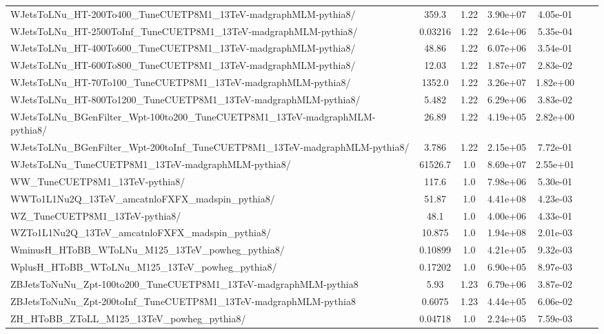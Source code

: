 \begin{table}
\begin{center}
{\begin{tabular}{|l|c|c|c|c|c|c|}
WJetsToLNu\_HT-200To400\_TuneCUETP8M1\_13TeV-madgraphMLM-pythia8/ & 359.3 & 1.22 & 3.90e+07 & {\color{orange}4.05e-01} \\
WJetsToLNu\_HT-2500ToInf\_TuneCUETP8M1\_13TeV-madgraphMLM-pythia8/ & 0.03216 & 1.22 & 2.64e+06 & 5.35e-04 \\
WJetsToLNu\_HT-400To600\_TuneCUETP8M1\_13TeV-madgraphMLM-pythia8/ & 48.86 & 1.22 & 6.07e+06 & {\color{orange}3.54e-01} \\
WJetsToLNu\_HT-600To800\_TuneCUETP8M1\_13TeV-madgraphMLM-pythia8/ & 12.03 & 1.22 & 1.87e+07 & 2.83e-02 \\
WJetsToLNu\_HT-70To100\_TuneCUETP8M1\_13TeV-madgraphMLM-pythia8/ & 1352.0 & 1.22 & 3.26e+07 & {\color{red}1.82e+00} \\
WJetsToLNu\_HT-800To1200\_TuneCUETP8M1\_13TeV-madgraphMLM-pythia8/ & 5.482 & 1.22 & 6.29e+06 & 3.83e-02 \\
WJetsToLNu\_BGenFilter\_Wpt-100to200\_TuneCUETP8M1\_13TeV-madgraphMLM-pythia8/ & 26.89 & 1.22 & 4.19e+05 & {\color{red}2.82e+00} \\
WJetsToLNu\_BGenFilter\_Wpt-200toInf\_TuneCUETP8M1\_13TeV-madgraphMLM-pythia8/ & 3.786 & 1.22 & 2.15e+05 & {\color{orange}7.72e-01} \\
WJetsToLNu\_TuneCUETP8M1\_13TeV-madgraphMLM-pythia8/ & 61526.7 & 1.0 & 8.69e+07 & {\color{red}2.55e+01} \\
WW\_TuneCUETP8M1\_13TeV-pythia8/ & 117.6 & 1.0 & 7.98e+06 & {\color{orange}5.30e-01} \\
WWTo1L1Nu2Q\_13TeV\_amcatnloFXFX\_madspin\_pythia8/ & 51.87 & 1.0 & 4.41e+08 & 4.23e-03 \\
WZ\_TuneCUETP8M1\_13TeV-pythia8/ & 48.1 & 1.0 & 4.00e+06 & {\color{orange}4.33e-01} \\
WZTo1L1Nu2Q\_13TeV\_amcatnloFXFX\_madspin\_pythia8/ & 10.875 & 1.0 & 1.94e+08 & 2.01e-03 \\
WminusH\_HToBB\_WToLNu\_M125\_13TeV\_powheg\_pythia8/ & 0.10899 & 1.0 & 4.21e+05 & 9.32e-03 \\
WplusH\_HToBB\_WToLNu\_M125\_13TeV\_powheg\_pythia8/ & 0.17202 & 1.0 & 6.90e+05 & 8.97e-03 \\
ZBJetsToNuNu\_Zpt-100to200\_TuneCUETP8M1\_13TeV-madgraphMLM-pythia8 & 5.93 & 1.23 & 6.79e+06 & 3.87e-02 \\
ZBJetsToNuNu\_Zpt-200toInf\_TuneCUETP8M1\_13TeV-madgraphMLM-pythia8 & 0.6075 & 1.23 & 4.44e+05 & 6.06e-02 \\
ZH\_HToBB\_ZToLL\_M125\_13TeV\_powheg\_pythia8/ & 0.04718 & 1.0 & 2.24e+05 & 7.59e-03 \\

\end{tabular}}
\end{center}
\end{table}
